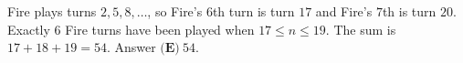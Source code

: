 Fire plays turns $2,5,8,\dots$, so Fire's $6$th turn is turn $17$ and Fire's $7$th is turn $20$. Exactly $6$ Fire turns have been played when $17\le n\le19$. The sum is $17+18+19=54$. Answer $\boxed{\textbf{(E)}\ 54}$.
